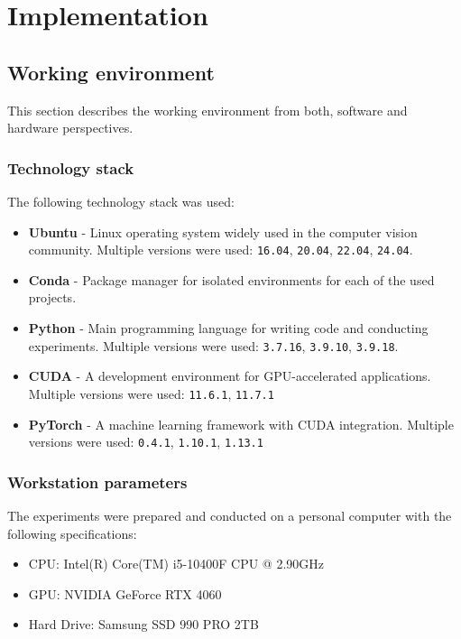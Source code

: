 
\chapter{Implementation} \label{chap:implementation}

\section{Working environment}

This section describes the working environment from both, software and hardware perspectives.

\subsection{Technology stack}

The following technology stack was used:
\begin{itemize}
  \item \textbf{Ubuntu} - Linux operating system widely used in the computer vision community.
  Multiple versions were used: \texttt{16.04}, \texttt{20.04}, \texttt{22.04}, \texttt{24.04}. \cite{ubuntu-site}
  \item \textbf{Conda} - Package manager for isolated environments for each of the used projects. \cite{conda-documentation}
  \item \textbf{Python} - Main programming language for writing code and conducting experiments.
  Multiple versions were used: \texttt{3.7.16}, \texttt{3.9.10}, \texttt{3.9.18}. \cite{python}
  \item \textbf{CUDA} - A development environment for GPU-accelerated applications.
  Multiple versions were used: \texttt{11.6.1}, \texttt{11.7.1} \cite{cuda-toolkit}
  \item \textbf{PyTorch} - A machine learning framework with CUDA integration.
  Multiple versions were used: \texttt{0.4.1}, \texttt{1.10.1}, \texttt{1.13.1} \cite{pytorch}
\end{itemize}

\subsection{Workstation parameters}

The experiments were prepared and conducted on a personal computer with the following specifications:
\begin{itemize}
  \item CPU: Intel(R) Core(TM) i5-10400F CPU @ 2.90GHz \cite{intel-core-cpu}
  \item GPU: NVIDIA GeForce RTX 4060 \cite{nvidia-gpu}
  \item Hard Drive: Samsung SSD 990 PRO 2TB \cite{samsung-disc}
\end{itemize}

